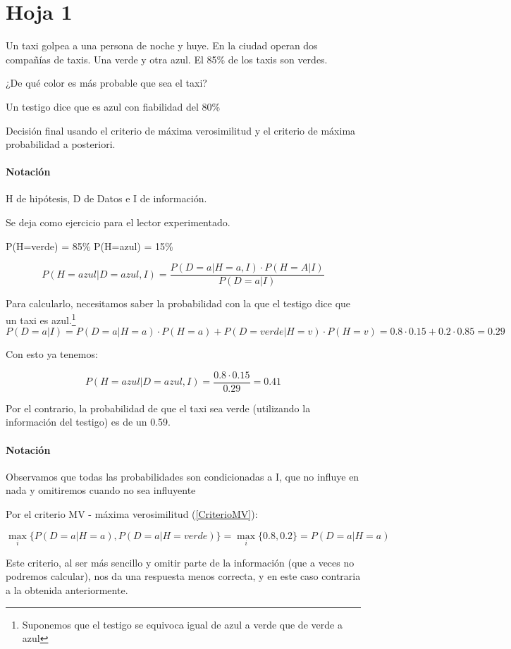 
\section{Hoja 1}

\begin{problem}[1]

Un taxi golpea a una persona de noche y huye. En la ciudad operan dos compañías de taxis. Una verde y otra azul. El 85\% de los taxis son verdes. 

\ppart
¿De qué color es más probable que sea el taxi?

\ppart
Un testigo dice que es azul con fiabilidad del 80\%

\ppart Decisión final usando el criterio de máxima verosimilitud y el criterio de máxima probabilidad a posteriori.

\solution
\paragraph{Notación} H de hipótesis, D de Datos e I de información.

\spart
Se deja como ejercicio para el lector experimentado.

\spart
P(H=verde) = 85\%
P(H=azul) = 15\%

\[
P\left( H=azul | D=azul, I \right) = \frac{P(D=a|H=a,I)·P(H=A|I)}{P(D=a|I)}
\]

Para calcularlo, necesitamos saber la probabilidad con la que el testigo dice que un taxi es azul.\footnote{Suponemos que el testigo se equivoca igual de azul a verde que de verde a azul}
\[
P(D=a|I) = P(D=a|H=a)·P(H=a) + P(D=verde | H=v) · P(H=v) = 0.8·0.15 + 0.2·0.85 = 0.29
\]

Con esto ya tenemos:

\[
 P\left( H=azul | D=azul, I \right) = \frac{0.8·0.15}{0.29} = 0.41
\]

Por el contrario, la probabilidad de que el taxi sea verde (utilizando la información del testigo) es de un 0.59.

\paragraph{Notación} Observamos que todas las probabilidades son condicionadas a I, que no influye en nada y omitiremos cuando no sea influyente

\spart Por el criterio MV - máxima verosimilitud (\ref{CriterioMV}):

\[ \max_i  \{P(D=a|H=a),P(D=a|H=verde)\} = \max_i \{0.8,0.2\} = P(D=a|H=a)\]

Este criterio, al ser más sencillo y omitir parte de la información (que a veces no podremos calcular), nos da una respuesta menos correcta, y en este caso contraria a la obtenida anteriormente. 

\end{problem}

